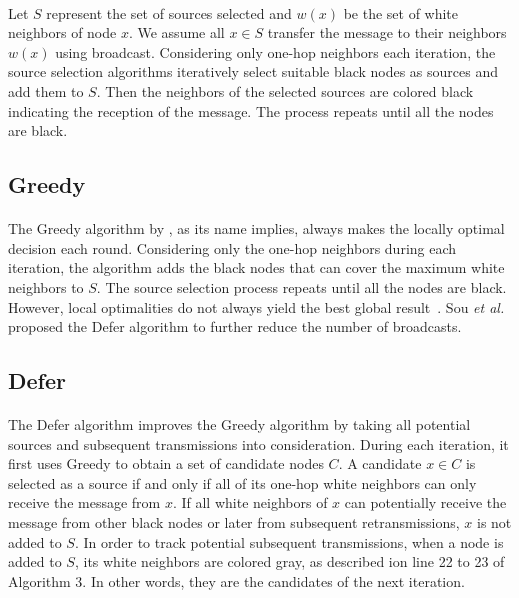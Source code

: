 \documentclass[a4paper,12pt]{report}
\begin{document}
\paragraph{}
Let $S$ represent the set of sources selected and $w(x)$ be the set of white neighbors of node $x$. We assume all $x \in S$ transfer the message to their neighbors $w(x)$ using broadcast. Considering only one-hop neighbors each iteration, the source selection algorithms iteratively select suitable black nodes as sources and add them to $S$. Then the neighbors of the selected sources are colored black indicating the reception of the message. The process repeats until all the nodes are black.


\subsection{Greedy}

\paragraph{}
The Greedy algorithm by \cite{prose}, as its name implies, always makes the locally optimal decision each round. Considering only the one-hop neighbors during each iteration, the algorithm adds the black nodes that can cover the maximum white neighbors to $S$. The source selection process repeats until all the nodes are black. However, local optimalities do not always yield the best global result~\cite{prose}. Sou {\it et al.}\cite{prose} proposed the Defer algorithm to further reduce the number of broadcasts.

\subsection{Defer}

\paragraph{}
The Defer algorithm\cite{prose} improves the Greedy algorithm by taking all potential sources and subsequent transmissions into consideration. During each iteration, it first uses Greedy to obtain a set of candidate nodes $C$. A candidate $x \in C$ is selected as a source if and only if all of its one-hop white neighbors can only receive the message from $x$. If all white neighbors of $x$ can potentially receive the message from other black nodes or later from subsequent retransmissions, $x$ is not added to $S$. In order to track potential subsequent transmissions, when a node is added to $S$, its white neighbors are colored gray, as described ion line 22 to 23 of Algorithm 3. In other words, they are the candidates of the next iteration.
\end{document}
